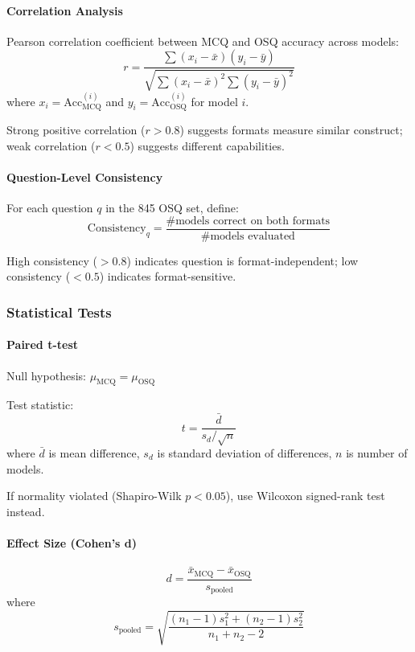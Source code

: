 \paragraph{Correlation Analysis}
Pearson correlation coefficient between MCQ and OSQ accuracy across models:
\begin{equation}
r = \frac{\sum (x_i - \bar{x})(y_i - \bar{y})}{\sqrt{\sum (x_i - \bar{x})^2 \sum (y_i - \bar{y})^2}}
\end{equation}
where $x_i = \text{Acc}_{\text{MCQ}}^{(i)}$ and $y_i = \text{Acc}_{\text{OSQ}}^{(i)}$ for model $i$.

Strong positive correlation ($r > 0.8$) suggests formats measure similar construct; weak correlation ($r < 0.5$) suggests different capabilities.

\paragraph{Question-Level Consistency}
For each question $q$ in the 845 OSQ set, define:
\begin{equation}
\text{Consistency}_q = \frac{\# \text{models correct on both formats}}{\# \text{models evaluated}}
\end{equation}

High consistency ($> 0.8$) indicates question is format-independent; low consistency ($< 0.5$) indicates format-sensitive.

\subsubsection{Statistical Tests}

\paragraph{Paired t-test}
Null hypothesis: $\mu_{\text{MCQ}} = \mu_{\text{OSQ}}$

Test statistic:
\begin{equation}
t = \frac{\bar{d}}{s_d / \sqrt{n}}
\end{equation}
where $\bar{d}$ is mean difference, $s_d$ is standard deviation of differences, $n$ is number of models.

If normality violated (Shapiro-Wilk $p < 0.05$), use Wilcoxon signed-rank test instead.

\paragraph{Effect Size (Cohen's d)}
\begin{equation}
d = \frac{\bar{x}_{\text{MCQ}} - \bar{x}_{\text{OSQ}}}{s_{\text{pooled}}}
\end{equation}
where
\begin{equation}
s_{\text{pooled}} = \sqrt{\frac{(n_1 - 1)s_1^2 + (n_2 - 1)s_2^2}{n_1 + n_2 - 2}}
\end{equation}

